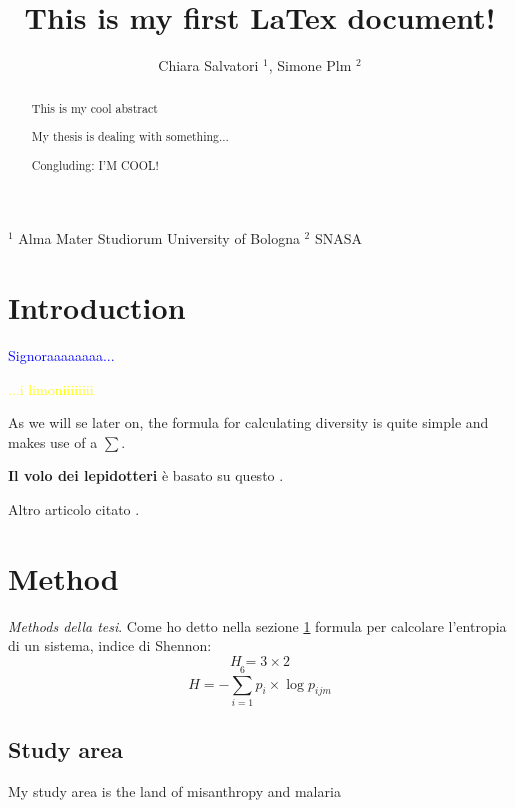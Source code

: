 \documentclass[a4paper, 12pt]{article}
\title{This is my first LaTex document!}
\author{Chiara Salvatori $^1$, Simone Plm $^2$} %
\begin{document}
\maketitle
\tableofcontents
$^1$ Alma Mater Studiorum University of Bologna
$^2$ SNASA
\begin{abstract}
This is my cool abstract

My thesis is dealing with something...

Congluding: I'M COOL!
\end{abstract}

\section{Introduction}\label{section:intro} %
\textcolor{blue}{Signoraaaaaaaa...}

\textcolor{yellow}{...i limoniiiiiiii}

As we will se later on, the formula for calculating diversity is quite simple and makes use of a $\sum$.

\textbf{Il volo dei lepidotteri} è basato su questo \citep{parlin}.

Altro articolo citato \citep{hersh}.

\section{Method}
\textit{Methods della tesi}. Come ho detto nella sezione \ref{section:intro}
formula per calcolare l'entropia di un sistema, indice di Shennon:
\begin{equation}
    H = 3 \times 2
    \label{eq:moltiplica}
\end{equation}
\begin{equation}
    H = - \sum_{i=1}^{6} p_i \times \log{p_{ijm}}
    \label{eq:shannon}
\end{equation}
\subsection{Study area}
My study area is the land of misanthropy and malaria 
\end{document}

